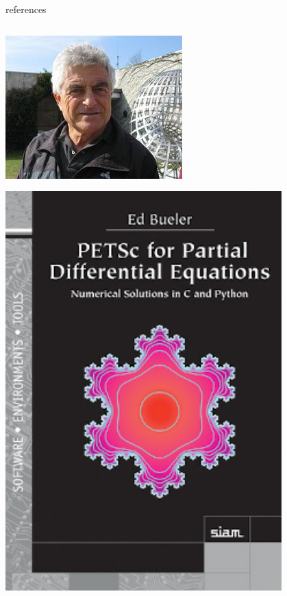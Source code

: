 \documentclass[10pt,
               svgnames,
               hyperref={colorlinks,citecolor=DeepPink4,linkcolor=FireBrick,urlcolor=Maroon},
               usepdftitle=false]{beamer}
\begin{document}
\begin{frame}{references}
\begin{columns}
\begin{column}{0.15\textwidth}
\hfill \includegraphics[width=\textwidth]{images/abrandt.jpg}

\vspace{7mm}
\hfill \includegraphics[width=0.8\textwidth]{images/bueler.jpg}


\end{column}
\end{columns}
\end{frame}
\end{document}
